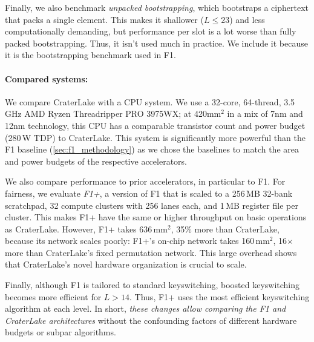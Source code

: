 Finally, we also benchmark \emph{unpacked bootstrapping}, which bootstraps a
ciphertext that packs a single element. This makes it shallower ($L{\leq}23$)
and less computationally demanding, but performance per slot is a lot worse
than fully packed bootstrapping. Thus, it isn't used much in practice. We
include it because it is the bootstrapping benchmark used in
F1.

\paragraph{Compared systems:}
We compare CraterLake with a CPU system. We use a 32-core, 64-thread, 3.5\,GHz
AMD Ryzen Threadripper PRO 3975WX; at 420mm$^2$ in a mix of 7nm and 12nm
technology, this CPU has a comparable transistor count and power budget (280\,W
TDP) to CraterLake. This system is significantly more powerful than the F1
baseline (\autoref{sec:f1_methodology}) as we chose the baselines to match the
area and power budgets of the respective accelerators.

We also compare performance to prior accelerators, in particular to
F1. For fairness, we evaluate \emph{F1+}, a version
of F1 that is scaled to a 256\,MB 32-bank scratchpad, 32 compute clusters with
256 lanes each, and 1\,MB register file per cluster. This makes F1+ have the
same or higher throughput on basic operations as CraterLake. However, F1+ takes
636\,mm$^2$, 35\% more than CraterLake, because its network scales poorly:
F1+'s on-chip network takes 160\,mm$^2$, 16$\times$ more than CraterLake's
fixed permutation network. This large overhead shows that CraterLake's novel
hardware organization is crucial to scale.

Finally, although F1 is tailored to standard keyswitching, boosted keyswitching
becomes more efficient for $L>14$. Thus, F1+ uses the most efficient
keyswitching algorithm at each level. In short, \emph{these changes allow
comparing the F1 and CraterLake architectures} without the confounding factors of
different hardware budgets or subpar algorithms.

